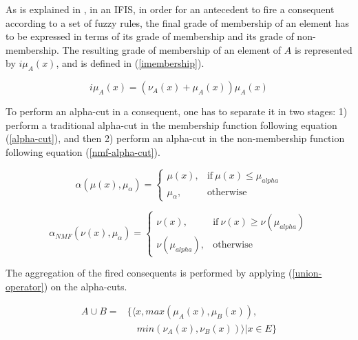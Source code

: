 \documentclass[review]{elsarticle}
\begin{document}

As is explained in \cite{Hernandez-Aguila2016}, in an IFIS, in order for an antecedent to fire a consequent according to a set of fuzzy rules, the final grade of membership of an element has to be expressed in terms of its grade of membership and its grade of non-membership. The resulting grade of membership of an element of $A$ is represented by $i\mu_{A}(x)$, and is defined in (\ref{imembership}).

\begin{equation}
  \label{imembership}
  i\mu_{A}(x) = (\nu_{A}(x) + \mu_{A}(x))\mu_{A}(x)
\end{equation}

To perform an alpha-cut in a consequent, one has to separate it in two stages: 1) perform a traditional alpha-cut in the membership function following equation (\ref{alpha-cut}), and then 2) perform an alpha-cut in the non-membership function following equation (\ref{nmf-alpha-cut}).

\begin{equation}
  \label{alpha-cut}
  \alpha(\mu (x),\mu_{\alpha}) =
  \begin{cases}
    \mu (x), & \text{if}\ \mu (x) \leq \mu_{alpha}  \\
    \mu_{\alpha}, & \text{otherwise}
  \end{cases}
\end{equation}

\begin{equation}
  \label{nmf-alpha-cut}
  \alpha_{NMF}(\nu (x),\mu_{\alpha}) =
  \begin{cases}
    \nu (x), & \text{if}\ \nu (x) \geq \nu (\mu_{alpha})  \\
    \nu (\mu_{alpha}), & \text{otherwise}
  \end{cases}
\end{equation}

The aggregation of the fired consequents is performed by applying (\ref{union-operator}) on the alpha-cuts.

\begin{equation}
  \label{union-operator}
  \begin{aligned}
    A \cup B  = &\{ \langle x, max(\mu_{A} (x), \mu_{B} (x)),\\
    &\quad min(\nu_{A} (x), \nu_{B} (x)) \rangle | x \in E \}
\end{aligned}
\end{equation}
\end{document}
